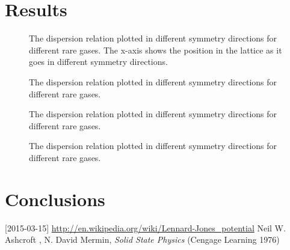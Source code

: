 \documentclass[11pt]{article}
\begin{document}
\newpage
\section{Results}
\begin{figure}[H]
	\centering
	\newlength\figureheight 
	\newlength\figurewidth 
	\setlength\figureheight{15cm} 
	\setlength\figurewidth{15cm}
	
	\caption{The dispersion relation plotted in different symmetry directions for different rare gases. The x-axis shows the position in the lattice as it goes in different symmetry directions.}
	\label{fig:Freq}
\end{figure}
\newpage
\begin{figure}[H]
	\centering
	\setlength\figureheight{18cm} 
	\setlength\figurewidth{14cm}
	
	\caption{The dispersion relation plotted in different symmetry directions for different rare gases.}
	\label{fig:VolDep}
\end{figure}
\newpage
\begin{figure}[H]
	\centering
	\setlength\figureheight{8cm} 
	\setlength\figurewidth{14cm}
	
	\caption{The dispersion relation plotted in different symmetry directions for different rare gases.}
	\label{fig:Ne440}
\end{figure}
\newpage
\begin{figure}[H]
	\centering
	\setlength\figureheight{16cm} 
	\setlength\figurewidth{14cm}
	
	\caption{The dispersion relation plotted in different symmetry directions for different rare gases.}
	\label{fig:Cv}
\end{figure}



\section{Conclusions}
\begin{thebibliography}{99}
 [2015-03-15] \url{http://en.wikipedia.org/wiki/Lennard-Jones_potential}
 Neil W. Ashcroft , N. David Mermin, \textit{Solid State Physics} (Cengage Learning 1976)
\end{thebibliography}
\end{document}
